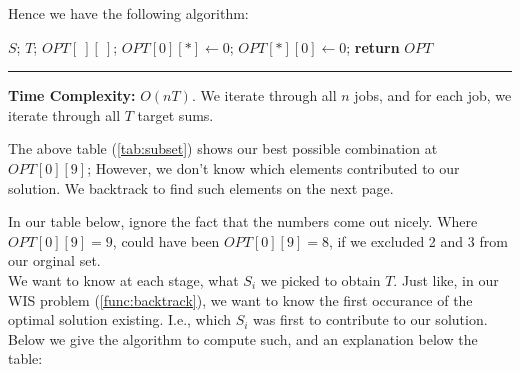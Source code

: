     \noindent
    Hence we have the following algorithm:
    \begin{Func}

        \vspace{-.5em}
        \begin{algorithm}[H]
            \SetAlgoLined
            $S$; $T$; $OPT[\ ][\ ]$; 
            $OPT[0][*] \gets 0$; 
            $OPT[*][0] \gets 0$; 
            \textbf{return} $OPT$\;
        \end{algorithm}
        \noindent
        \rule{\textwidth}{0.4pt}
        \textbf{Time Complexity:} $O(nT)$. We iterate through all $n$ jobs, and for each job, we iterate through all $T$ target sums.
    \end{Func}

    \noindent
    The above table (\ref{tab:subset}) shows our best possible combination at $OPT[0][9]$; However, we don't know which elements
    contributed to our solution. We backtrack to find such elements on the next page.

    \newpage 

    \noindent
    In our table below, ignore the fact that the numbers come out nicely. Where $OPT[0][9]=9$, could have been $OPT[0][9]=8$, if we excluded 2 and 3 from our orginal set.\\

    \noindent
    We want to know at each stage, what $S_i$ we picked to obtain $T$. Just like, in our WIS problem (\ref{func:backtrack}), we want to know 
    the first occurance of the optimal solution existing. I.e., which $S_i$ was first to contribute to our solution.\\
    
    \noindent
    Below we give the algorithm to compute such, and an explanation below the table:
    

